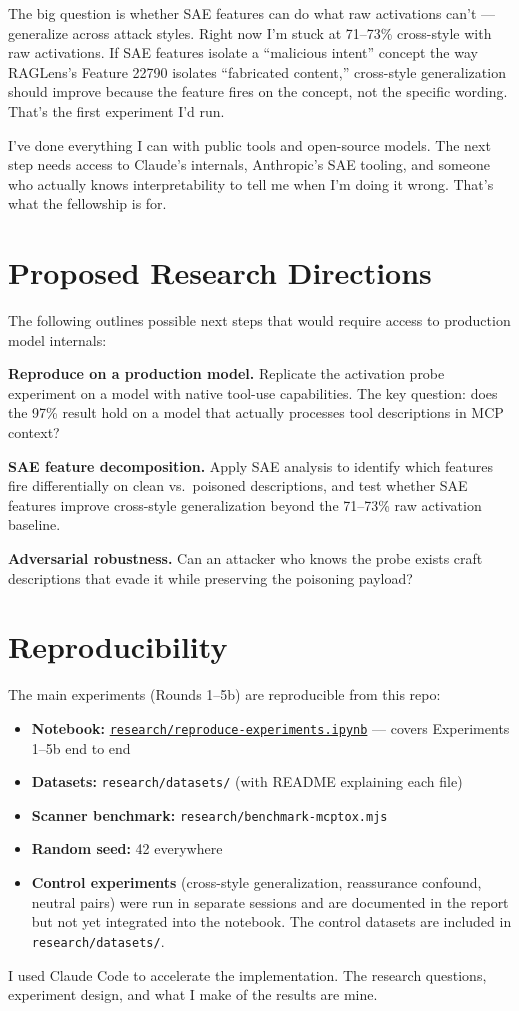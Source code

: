 \documentclass[11pt]{article}
\begin{document}
The big question is whether SAE features can do what raw activations can't --- generalize across attack styles. Right now I'm stuck at 71--73\% cross-style with raw activations. If SAE features isolate a ``malicious intent'' concept the way RAGLens's Feature 22790 isolates ``fabricated content,'' cross-style generalization should improve because the feature fires on the concept, not the specific wording. That's the first experiment I'd run.

I've done everything I can with public tools and open-source models. The next step needs access to Claude's internals, Anthropic's SAE tooling, and someone who actually knows interpretability to tell me when I'm doing it wrong. That's what the fellowship is for.

\appendix
\section{Proposed Research Directions}
\label{app:future}

The following outlines possible next steps that would require access to production model internals:

\textbf{Reproduce on a production model.} Replicate the activation probe experiment on a model with native tool-use capabilities. The key question: does the 97\% result hold on a model that actually processes tool descriptions in MCP context?

\textbf{SAE feature decomposition.} Apply SAE analysis to identify which features fire differentially on clean vs.\ poisoned descriptions, and test whether SAE features improve cross-style generalization beyond the 71--73\% raw activation baseline.

\textbf{Adversarial robustness.} Can an attacker who knows the probe exists craft descriptions that evade it while preserving the poisoning payload?

\section{Reproducibility}

The main experiments (Rounds 1--5b) are reproducible from this repo:
\begin{itemize}
\item \textbf{Notebook:} \href{https://github.com/mcpware/claude-code-organizer/blob/main/research/reproduce-experiments.ipynb}{\texttt{research/reproduce-experiments.ipynb}} --- covers Experiments 1--5b end to end
\item \textbf{Datasets:} \texttt{research/datasets/} (with README explaining each file)
\item \textbf{Scanner benchmark:} \texttt{research/benchmark-mcptox.mjs}
\item \textbf{Random seed:} 42 everywhere
\item \textbf{Control experiments} (cross-style generalization, reassurance confound, neutral pairs) were run in separate sessions and are documented in the report but not yet integrated into the notebook. The control datasets are included in \texttt{research/datasets/}.
\end{itemize}

I used Claude Code to accelerate the implementation. The research questions, experiment design, and what I make of the results are mine.



\end{document}
